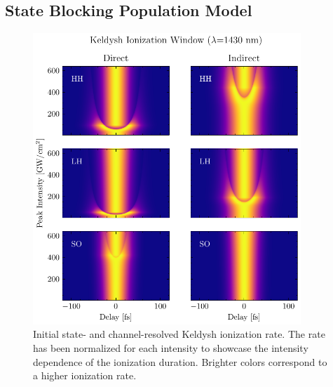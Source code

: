 \subsection{State Blocking Population Model}
\label{sec:SB_population_model}

\begin{figure}
	\centering
	\includegraphics[width=0.9\textwidth]{figures/chap4/Keldysh_SingleInt_IonizationWindow.pdf}
	\caption{Initial state- and channel-resolved Keldysh ionization rate. The rate has been normalized for each intensity to showcase the intensity dependence of the ionization duration. Brighter colors correspond to a higher ionization rate.}
	\label{fig:Keldysh_SingleInt_IonizationWindow}
\end{figure}


